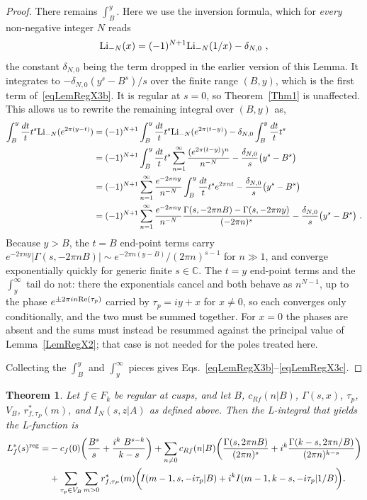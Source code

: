 \documentclass[11pt,a4paper]{article}
\newcommand{\G}{\Gamma}
\newtheorem{thm}{Theorem}[section]
\def\C{\mathbb{C}}
\newcommand{\reg}{{\rm reg}}
\begin{document}
\begin{proof}
There remains $\int_B^y$. Here we use the inversion formula, which for {\em every} non-negative
integer $N$ reads
\begin{align}
{\rm Li}_{-N}(x) = (-1)^{N+1} {\rm Li}_{-N}(1/x) - \delta_{N,0}~,
\end{align}
the constant $\delta_{N,0}$ being the term dropped in the earlier version of this Lemma. It
integrates to $-\delta_{N,0}(y^s-B^s)/s$ over the finite range $(B,y)$, which is the first term
of~\eqref{eqLemRegX3b}. It is regular at $s=0$, so Theorem~\ref{Thm1} is unaffected. This allows us
to rewrite the remaining integral over $(B,y)$ as,
\begin{align}
\int_{B}^{y}\frac{dt}{t} t^s {\rm Li}_{-N}(e^{2 \pi (y-t)})
&= (-1)^{N+1}\int_{B}^{y}\frac{dt}{t} t^s {\rm Li}_{-N}(e^{2 \pi (t-y)}) - \delta_{N,0}\int_{B}^{y}\frac{dt}{t}t^s
\\
&= (-1)^{N+1}\int_{B}^{y}\frac{dt}{t} t^s \sum_{n = 1}^{\infty} \frac{(e^{2 \pi (t-y)})^n}{n^{-N}}
- \frac{\delta_{N,0}}{s}\big(y^s - B^s\big)
\\
&= (-1)^{N+1}\sum_{n = 1}^{\infty} \frac{e^{-2 \pi n y}}{n^{-N}} \int_{B}^{y}\frac{dt}{t} t^s e^{2 \pi n t}
- \frac{\delta_{N,0}}{s}\big(y^s - B^s\big)
\\
&= (-1)^{N+1}\sum_{n = 1}^{\infty} \frac{e^{-2 \pi n y} }{n^{-N}}
\frac{\G(s,-2\pi n B) - \G(s,-2\pi n y)}{(-2 \pi n)^{s}}
- \frac{\delta_{N,0}}{s}\big(y^s - B^s\big)~.
\end{align}
Because $y > B$, the $t=B$ end-point terms carry $e^{-2\pi n y}|\G(s,-2\pi n B)| \sim e^{-2 \pi n (y-B)}/(2 \pi n)^{s-1}$ for $n \gg 1$, and converge exponentially quickly for generic finite $s \in \C$. The $t=y$ end-point terms and the $\int_y^\infty$ tail do not: there the exponentials cancel and both behave as $n^{N-1}$, up to the phase $e^{\pm 2 \pi i n {\rm Re}(\tau_p)}$ carried by $\tau_p = iy + x$ for $x \neq 0$, so each converges only conditionally, and the two must be summed together. For $x = 0$ the phases are absent and the sums must instead be resummed against the principal value of Lemma~\ref{LemRegX2}; that case is not needed for the poles treated here.

Collecting the $\int_B^y$ and $\int_y^\infty$ pieces gives Eqs.~\eqref{eqLemRegX3b}--\eqref{eqLemRegX3c}.
\end{proof}

\begin{thm}\label{ThmLfn}
Let $f \in F_k$ be regular at cusps, and let $B$, $c_{Rf}(n|B)$, $\G(s,x)$, $\tau_p$, $V_B$, $r^*_{f,\tau_P}(m)$, and $I_N(s,z|A)$ as defined above. Then the L-integral that yields the L-function is
\begin{align} 
L_f^*(s)^{\reg} =&-c_f(0) \bigg(\frac{B^s}{s} + \frac{i^k~B^{s-k}}{k-s} \bigg) + \sum_{n \neq 0} c_{Rf}(n|B) \bigg( \frac{\G(s,2\pi n B)}{(2\pi n)^s}  + i^k \frac{\G(k-s,2\pi n/B)}{(2\pi n)^{k-s}}  \bigg) \nonumber\\
&+\sum_{\tau_p \in V_B} \sum_{m > 0} r^*_{f,\tau_P}(m) \bigg( \! I(m-1,s,-i\tau_p|B) + i^k I(m-1,k-s,-i\tau_p|1/B) \! \bigg).\!
\label{eqLfn}
\end{align}
\end{thm}
\end{document}
